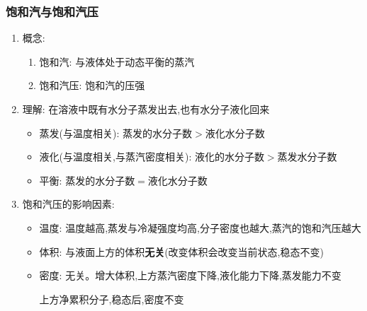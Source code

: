 \documentclass{article}
\begin{document}
\subsubsection{饱和汽与饱和汽压}
\begin{enumerate}
    \item 概念:
          \begin{enumerate}[label = (\arabic*)]
              \item 饱和汽: 与液体处于动态平衡的蒸汽
              \item 饱和汽压: 饱和汽的压强
          \end{enumerate}
    \item 理解: 在溶液中既有水分子蒸发出去,也有水分子液化回来
          \begin{itemize}
              \item 蒸发(与温度相关): 蒸发的水分子数$>$液化水分子数
              \item 液化(与温度相关,与蒸汽密度相关): 液化的水分子数$>$蒸发水分子数
              \item 平衡: 蒸发的水分子数$=$液化水分子数
          \end{itemize}
    \item 饱和汽压的影响因素:
          \begin{itemize}
              \item 温度: 温度越高,蒸发与冷凝强度均高,分子密度也越大,蒸汽的饱和汽压越大
              \item 体积: 与液面上方的体积\textbf{无关}(改变体积会改变当前状态,稳态不变)
              \item 密度: 无关。增大体积,上方蒸汽密度下降,液化能力下降,蒸发能力不变

                    \hspace{2.7em}上方净累积分子,稳态后,密度不变
          \end{itemize}
\end{enumerate}

\vspace{2em}
\end{document}
